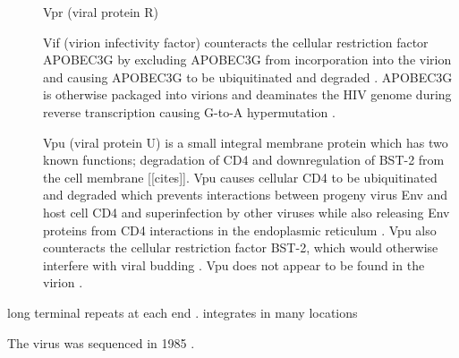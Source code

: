 \documentclass[../sherrill-Mix_thesis.tex]{subfiles}
\begin{document}
\begin{description}
	\item[\vpr{}]
		Vpr (viral protein R)
	\item[\vif{}]
		Vif (virion infectivity factor) counteracts the cellular restriction factor APOBEC3G \citep{Sheehy2002} by excluding APOBEC3G from incorporation into the virion \citep{Mariani2003} and causing APOBEC3G to be ubiquitinated and degraded \citep{Sheehy2003,Marin2003,Yu2003}. APOBEC3G is otherwise packaged into virions \citep{Harris2003} and deaminates the HIV genome during reverse transcription causing G-to-A hypermutation \citep{Harris2003,Mangeat2003,Zhang2003,Lecossier2003}.
	\item[\vpu{}]
		Vpu (viral protein U) \citep{Cohen1988,Strebel1988} is a small integral membrane protein which has two known functions; degradation of CD4 and downregulation of BST-2 from the cell membrane [[cites]]. Vpu causes cellular CD4 to be ubiquitinated and degraded \citep{Willey1992,Bour1995} which prevents interactions between progeny virus Env and host cell CD4 \citep{Marshall1992,Lama1999,Ross1999,Cortes2002} and superinfection by other viruses \citep{Benson1993}  while also releasing Env proteins from CD4 interactions in the endoplasmic reticulum \citep{Crise1990,Bour1991}. Vpu also counteracts the cellular restriction factor BST-2, which would otherwise interfere with viral budding \citep{Neil2008}. Vpu does not appear to be found in the virion \citep{Strebel1989}.
\end{description}









long terminal repeats at each end \citep{Hughes1978}. integrates in many locations \citep{Hughes1978}


The virus was sequenced in 1985 \citep{Wain-Hobson1985,Muesing1985,Ratner1985,Sanchez-Pescador1985}.
\end{document}

